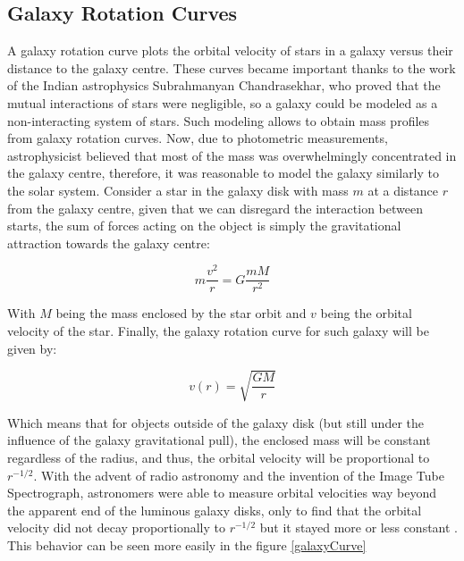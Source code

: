 \subsection{Galaxy Rotation Curves}
A galaxy rotation curve plots the orbital velocity of stars in a galaxy versus their distance to the galaxy centre.
These curves became important thanks to the work of the Indian astrophysics Subrahmanyan Chandrasekhar, who proved that the mutual interactions of stars were negligible, so a galaxy could be modeled as a non-interacting system of stars. Such modeling allows to obtain mass profiles from galaxy rotation curves.
Now, due to photometric measurements, astrophysicist believed that most of the mass was overwhelmingly concentrated  in the galaxy centre, therefore, it was reasonable to model the galaxy similarly to the solar system.
Consider a star in the galaxy disk with mass $m$ at a distance $r$ from the galaxy centre, given that we can disregard the interaction between starts, the sum of forces acting on the object is simply the gravitational attraction towards the galaxy centre:

\begin{equation}
m\frac{v^2}{r} = G \frac{mM}{r^2}
\end{equation}

With $M$ being the mass enclosed by the star orbit and $v$ being the orbital velocity of the star. Finally, the galaxy rotation curve for such galaxy will be given by:

\begin{equation}
v(r) = \sqrt{\frac{GM}{r}}
\end{equation}

Which means that for objects outside of the galaxy disk (but still under the influence of the galaxy gravitational pull), the enclosed mass will be constant regardless of the radius, and thus, the orbital velocity will be proportional to $r^{-1/2}$. With the advent of radio astronomy and the invention of the Image Tube Spectrograph, astronomers were able to measure orbital velocities way beyond the apparent end of the luminous galaxy disks, only to find that the orbital velocity did not decay proportionally to $r^{-1/2}$ but it stayed more or less constant\cite{h21Line} \cite{galactoDistance} \cite{veraFirst}. This behavior can be seen more easily in the figure \ref{galaxyCurve}

